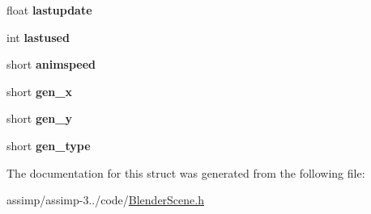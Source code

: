 \begin{DoxyCompactItemize}
\item 
\hypertarget{struct_assimp_1_1_blender_1_1_image_a2146ddb567bdd6462b7762da9b66635f}{float {\bfseries lastupdate}}\label{struct_assimp_1_1_blender_1_1_image_a2146ddb567bdd6462b7762da9b66635f}

\item 
\hypertarget{struct_assimp_1_1_blender_1_1_image_a716d9a931121652c76d2e88b02d8b12b}{int {\bfseries lastused}}\label{struct_assimp_1_1_blender_1_1_image_a716d9a931121652c76d2e88b02d8b12b}

\item 
\hypertarget{struct_assimp_1_1_blender_1_1_image_ade50d6d567f14404cca5e36d530e7a49}{short {\bfseries animspeed}}\label{struct_assimp_1_1_blender_1_1_image_ade50d6d567f14404cca5e36d530e7a49}

\item 
\hypertarget{struct_assimp_1_1_blender_1_1_image_a56f13ea714777f2a945cf619de3c89e1}{short {\bfseries gen\+\_\+x}}\label{struct_assimp_1_1_blender_1_1_image_a56f13ea714777f2a945cf619de3c89e1}

\item 
\hypertarget{struct_assimp_1_1_blender_1_1_image_a8db5031406a065fed97644aa789920ff}{short {\bfseries gen\+\_\+y}}\label{struct_assimp_1_1_blender_1_1_image_a8db5031406a065fed97644aa789920ff}

\item 
\hypertarget{struct_assimp_1_1_blender_1_1_image_a413de86172bfc4d4cc5c174f841846ef}{short {\bfseries gen\+\_\+type}}\label{struct_assimp_1_1_blender_1_1_image_a413de86172bfc4d4cc5c174f841846ef}

\end{DoxyCompactItemize}


The documentation for this struct was generated from the following file\+:\begin{DoxyCompactItemize}
\item 
assimp/assimp-\/3../code/\hyperlink{_blender_scene_8h}{Blender\+Scene.\+h}\end{DoxyCompactItemize}
